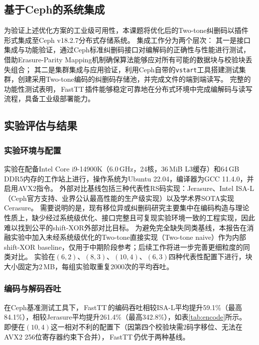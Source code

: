 \subsection{基于Ceph的系统集成}

为验证上述优化方案的工业级可用性，本课题将优化后的Two-tone纠删码以插件形式集成至Ceph v18.2.7分布式存储系统。
集成工作分为两个层次：
其一是接口集成与功能验证，通过Ceph标准纠删码接口对编解码的正确性与性能进行测试，借助Erasure-Parity Mapping机制确保算法能够应对所有可能的数据块与校验块丢失组合；
其二是集群集成与应用验证，利用Ceph自带的\texttt{vstart}工具搭建测试集群，创建采用Two-tone编码的纠删码存储池，并完成文件的端到端读写。
完整的功能性测试表明，\,FastTT\,插件能够稳定可靠地在分布式环境中完成编解码与读写流程，具备工业级部署能力。

\subsection{实验评估与结果}

\subsubsection{实验环境与配置}

实验在配备Intel Core i9-14900K（6.0\,GHz，24核，36\,MiB L3缓存）和64\,GB DDR5内存的工作站上进行，操作系统为Ubuntu 22.04，编译器为GCC 11.4.0，并启用AVX2指令。
外部对比基线包括三种代表性RS码实现：Jerasure\cite{plankJerasureLibraryFacilitating2008}、Intel ISA-L\cite{gajalwarExploringDataProtection2024}（Ceph官方支持、业界公认最高性能的生产级实现）以及学术界SOTA实现Cerasure\cite{wangFastAccelerationStrategies2025}。
需要说明的是，现有移位异或纠删码研究主要集中在编码构造与理论性质上，缺少经过系统级优化、接口完整且可复现实验环境一致的工程实现，因此难以找到公平的shift-XOR外部对比目标。
为避免完全缺失同类基线，本报告在消融实验中加入未经系统级优化的Two-tone直接实现（Two-tone naive）作为内部shift-XOR baseline，仅用于中期阶段参考；后续工作将进一步完善更细粒度的同类对比。
实验在$(6,2)$、$(8,3)$、$(10,4)$、$(6,3)$四种代表性配置下进行，块大小固定为2\,MB，每组实验取重复2000次的平均吞吐。

\subsubsection{编码与解码吞吐}

在Ceph基准测试工具下，\,FastTT\,的编码吞吐相较ISA-L平均提升59.1\%（最高84.1\%），相较Jerasure平均提升261.4\%（最高342.8\%），如表\ref{tab:encode}所示。
即便在$(10,4)$这一相对不利的配置下（因第四个校验块需2码字移位、无法在AVX2 256位寄存器约束下合并），\,FastTT\,仍优于两种基线。

